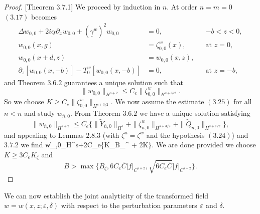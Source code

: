 \begin{proof}{[Theorem 3.7.1]} We proceed by induction in $n$. At order $n=m=0$ $(3.17)$ becomes
\begin{subequations}
\begin{align}
\Delta w_{0,0} +2i\underline{\alpha}\partial_{x}w_{0,0}+(\underline{\gamma}^w)^2w_{0,0}&=0,&&\text{$-b<z<0$}, \\
w_{0,0}(x,g)&=\zeta^w_{0,0}(x),&& \text{at $z=0$},\\
w_{0,0}(x+d,z)&=w_{0,0}(x,z), \\
\partial_z \left[w_{0,0}(x,-b)\right] - T_0^w[w_{0,0}(x,-b)]&=0,&& \text{at $z=-b$},
\end{align}
\end{subequations}
and Theorem $3.6.2$ guarantees a unique solution such that 
$$\|w_{0,0}\|_{H^{s+2}}\le C_e\|\zeta^w_{0,0}\|_{H^{s+3/2}}.   $$
So we choose $K \ge C_e\|\zeta^w_{0,0}\|_{H^{s+3/2}} $. We now assume the estimate $(3.25)$ for all $n < \overline{n}$ and study $w_{\overline{n},0}$. From Theorem $3.6.2$ we have a unique solution satisfying 
$$\|w_{\overline{n},0}\|_{H^{s+2}}\le C_e\{\|\tilde{Y}_{\overline{n},0}\|_{H^{s}}+\|\zeta^w_{\overline{n},0}\|_{H^{s+3/2}}+\|\tilde{Q}_{\overline{n},0}\|_{H^{s+1/2}}  \}, $$
and appealing to Lemmas $2.8.3$ (with $\zeta^u=\zeta^w$ and the hypothesis $(3.24)$) and $3.7.2$ we find
\bes
\|w_{,0}\|_{H^{s+2}}\le C_e\left\{K_{\zeta}B_{\zeta}^{} + 2K  \right\}.
\ees
We are done provided we choose $K \ge 3C_eK_{\zeta}$ and
$$ B > \max\Big\{B_{\zeta},6C_e\overline{C}|f|_{C^{s+2}},\sqrt{6C_e\overline{C}}|f|_{C^{s+2}} \Big\}.$$
\end{proof}
We can now establish the joint analyticity of the transformed field $w=w(x,z;\varepsilon,\delta)$ with respect to the perturbation parameters $\varepsilon$ and $\delta$.
